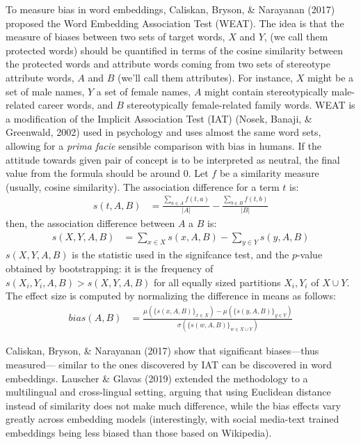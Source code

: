 \documentclass[
  10pt,
  dvipsnames,enabledeprecatedfontcommands]{scrartcl}
\begin{document}
To measure bias in word embeddings, Caliskan, Bryson, \& Narayanan
(2017) proposed the Word Embedding Association Test (WEAT). The idea is
that the measure of biases between two sets of target words, \(X\) and
\(Y\), (we call them protected words) should be quantified in terms of
the cosine similarity between the protected words and attribute words
coming from two sets of stereotype attribute words, \(A\) and \(B\)
(we'll call them attributes). For instance, \(X\) might be a set of male
names, \(Y\) a set of female names, \(A\) might contain stereotypically
male-related career words, and \(B\) stereotypically female-related
family words. WEAT is a modification of the Implicit Association Test
(IAT) (Nosek, Banaji, \& Greenwald, 2002) used in psychology and uses
almost the same word sets, allowing for a \emph{prima facie} sensible
comparison with bias in humans. If the attitude towards given pair of
concept is to be interpreted as neutral, the final value from the
formula should be around 0. Let \(f\) be a similarity measure (usually,
cosine similarity). The association difference for a term \(t\) is:
\begin{align}
s(t,A,B) & = \frac{\sum_{a\in A}f(t,a)}{\vert A\vert} - \frac{\sum_{b\in B}f(t,b)}{\vert B\vert}
\end{align} \noindent then, the association difference between \(A\) a
\(B\) is: \begin{align}
s(X,Y,A,B) & = \sum_{x\in X} s(x,A,B) -  \sum_{y\in Y} s(y,A,B)
\end{align} \noindent \(s(X,Y,A,B)\) is the statistic used in the
signifcance test, and the \(p\)-value obtained by bootstrapping: it is
the frequency of \(s(X_i,Y_i,A,B)>s(X,Y,A,B)\) for all equally sized
partitions \(X_i, Y_i\) of \(X\cup Y\). The effect size is computed by
normalizing the difference in means as follows: \begin{align}
bias(A,B) & = \frac{
\mu(\{s(x,A,B)\}_{x\in X}) -\mu(\{s(y,A,B)\}_{y\in Y}) 
}{
\sigma(\{s(w,A,B)\}_{w\in X\cup Y})
}
\end{align}

Caliskan, Bryson, \& Narayanan (2017) show that significant
biases---thus measured--- similar to the ones discovered by IAT can be
discovered in word embeddings. Lauscher \& Glavas (2019) extended the
methodology to a multilingual and cross-lingual setting, arguing that
using Euclidean distance instead of similarity does not make much
difference, while the bias effects vary greatly across embedding models
(interestingly, with social media-text trained embeddings being less
biased than those based on Wikipedia).
\end{document}
